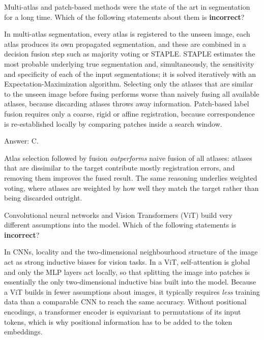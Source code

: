 \documentclass[11pt]{exam}
\begin{document}
\begin{questions}
\question
Multi-atlas and patch-based methods were the state of the art in segmentation for a long time.
Which of the following statements about them is \textbf{incorrect}?

\begin{choices}
  \choice In multi-atlas segmentation, every atlas is registered to the unseen image, each atlas
  produces its own propagated segmentation, and these are combined in a decision fusion step such
  as majority voting or STAPLE.
  \choice STAPLE estimates the most probable underlying true segmentation and, simultaneously,
  the sensitivity and specificity of each of the input segmentations; it is solved iteratively
  with an Expectation-Maximization algorithm.
  \choice Selecting only the atlases that are similar to the unseen image before fusing performs
  worse than naively fusing all available atlases, because discarding atlases throws away
  information.
  \choice Patch-based label fusion requires only a coarse, rigid or affine registration, because
  correspondence is re-established locally by comparing patches inside a search window.
\end{choices}

\begin{solution}
  Answer: C.

  Atlas selection followed by fusion \emph{outperforms} naive fusion of all atlases: atlases that
  are dissimilar to the target contribute mostly registration errors, and removing them improves
  the fused result. The same reasoning underlies weighted voting, where atlases are weighted by
  how well they match the target rather than being discarded outright.
\end{solution}

\question
Convolutional neural networks and Vision Transformers (ViT) build very different assumptions
into the model. Which of the following statements is \textbf{incorrect}?

\begin{choices}
  \choice In CNNs, locality and the two-dimensional neighbourhood structure of the image act as
  strong inductive biases for vision tasks.
  \choice In a ViT, self-attention is global and only the MLP layers act locally, so that
  splitting the image into patches is essentially the only two-dimensional inductive bias built
  into the model.
  \choice Because a ViT builds in fewer assumptions about images, it typically requires
  \emph{less} training data than a comparable CNN to reach the same accuracy.
  \choice Without positional encodings, a transformer encoder is equivariant to permutations of
  its input tokens, which is why positional information has to be added to the token embeddings.
\end{choices}


\end{questions}
\end{document}
